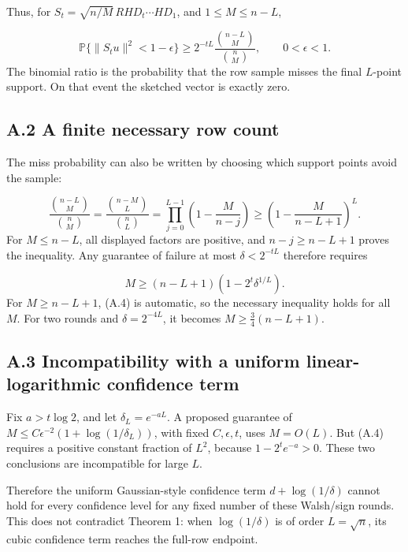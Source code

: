 \documentclass[11pt,a4paper]{article}
\begin{document}
Thus, for \(S_t=\sqrt{n/M}\,RH D_t\cdots HD_1\), and \(1\le M\le n-L\),

\begin{equation}
\mathbb P\{\|S_tu\|^2<1-\epsilon\}
\ge2^{-tL}\frac{\binom{n-L}{M}}{\binom nM},
\qquad 0<\epsilon<1.
\tag{A.2}
\end{equation}
The binomial ratio is the probability that the row sample misses the final \(L\)-point support. On that event the sketched vector is exactly zero.

\subsection*{A.2 A finite necessary row count}
The miss probability can also be written by choosing which support points avoid the sample:

\begin{equation}
\frac{\binom{n-L}{M}}{\binom nM}
=\frac{\binom{n-M}{L}}{\binom nL}
=\prod_{j=0}^{L-1}\left(1-\frac{M}{n-j}\right)
\ge\left(1-\frac{M}{n-L+1}\right)^L.
\tag{A.3}
\end{equation}
For \(M\le n-L\), all displayed factors are positive, and \(n-j\ge n-L+1\) proves the inequality. Any guarantee of failure at most \(\delta<2^{-tL}\) therefore requires

\begin{equation}
M\ge(n-L+1)\left(1-2^t\delta^{1/L}\right).
\tag{A.4}
\end{equation}
For \(M\ge n-L+1\), (A.4) is automatic, so the necessary inequality holds for all \(M\). For two rounds and \(\delta=2^{-4L}\), it becomes \(M\ge\frac34(n-L+1)\).

\subsection*{A.3 Incompatibility with a uniform linear-logarithmic confidence term}
Fix \(a>t\log2\), and let \(\delta_L=e^{-aL}\). A proposed guarantee of \(M\le C\epsilon^{-2}(1+\log(1/\delta_L))\), with fixed \(C,\epsilon,t\), uses \(M=O(L)\). But (A.4) requires a positive constant fraction of \(L^2\), because \(1-2^te^{-a}>0\). These two conclusions are incompatible for large \(L\).

Therefore the uniform Gaussian-style confidence term \(d+\log(1/\delta)\) cannot hold for every confidence level for any fixed number of these Walsh/sign rounds. This does not contradict Theorem 1: when \(\log(1/\delta)\) is of order \(L=\sqrt n\), its cubic confidence term reaches the full-row endpoint.
\end{document}
